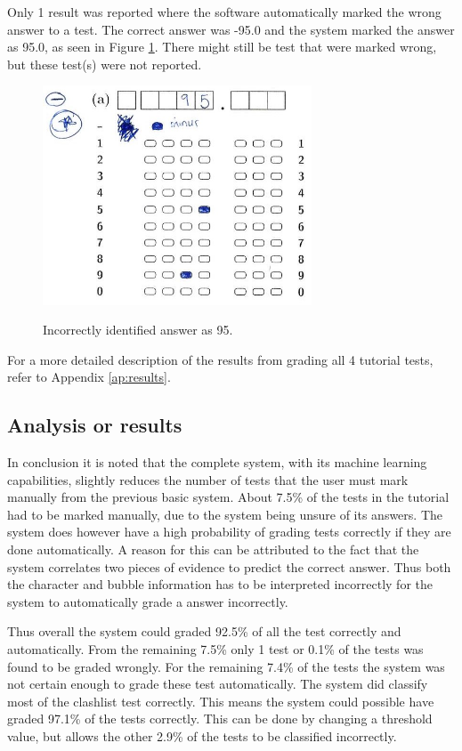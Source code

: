 Only 1 result was reported where the software automatically marked the wrong answer to a test. The correct answer was -95.0 and the system marked the answer as 95.0, as seen in Figure \ref{fig:wrongAns}. There might still be test that were marked wrong, but these test(s) were not reported.

\begin{figure}
  \centering
  \includegraphics[width=8cm]{wrongResult}\\
  \caption{Incorrectly identified answer as 95.}
  \label{fig:wrongAns}
\end{figure}

For a more detailed description of the results from grading all 4 tutorial tests, refer to Appendix \ref{ap:results}.

\subsection{Analysis or results}

In conclusion it is noted that the complete system, with its machine learning capabilities, slightly reduces the number of tests that the user must mark manually from the previous basic system. About 7.5\% of the tests in the tutorial had to be marked manually, due to the system being unsure of its answers. The system does however have a high probability of grading tests correctly if they are done automatically. A reason for this can be attributed to the fact that the system correlates two pieces of evidence to predict the correct answer. Thus both the character and bubble information has to be interpreted incorrectly for the system to automatically grade a answer incorrectly. 

Thus overall the system could graded 92.5\% of all the test correctly and automatically. From the remaining 7.5\% only 1 test or 0.1\% of the tests was found to be graded wrongly. For the remaining 7.4\% of the tests the system was not certain enough to grade these test automatically. The system did classify most of the clashlist test correctly. This means the system could possible have graded 97.1\% of the tests correctly. This can be done by changing a threshold value, but allows the other 2.9\% of the tests to be classified incorrectly.

